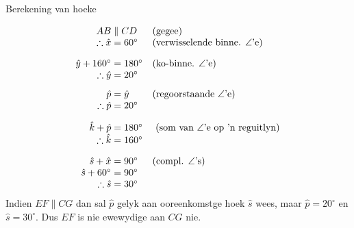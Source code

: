 \begin{wex}{Berekening van hoeke}
{\begin{center}
{}
 \end{center}
} 
{

\begin{equation*}
\begin{array}{r@{\;}l@{\quad}l}
AB &\parallel CD & \mbox{(gegee)} \\
\therefore \hat{x}&=60^{\circ} & \mbox{(verwisselende binne. $\angle$'e)}  \vspace{10pt} \\

\hat{y} + 160^\circ &= 180^{\circ}  & \mbox{(ko-binne. $\angle$'e)} \\
\therefore \hat{y} &= 20^{\circ} &   \vspace{8pt}\\


\hat{p} &= \hat{y} & \mbox{(regoorstaande $\angle$'e)} \\
\therefore \hat{p} &= 20^{\circ} &  \vspace{10pt}\\



 \hat{k} + \hat{p} &= 180^{\circ}  &\mbox{ (som van $\angle$'e op 'n reguitlyn)} \\
\therefore \hat{k} &= 160^{\circ} &  \vspace{10pt}\\


 \hat{s} + \hat{x} &= 90^{\circ}  & \mbox{(compl. $\angle$'s)} \\ 
 \hat{s} + 60^\circ &= 90^{\circ} & \\
\therefore \hat{s} &= 30^{\circ} &  
\end{array}
\end{equation*} 
Indien $EF \parallel CG$ dan sal $\hat{p}$ gelyk aan ooreenkomstge hoek $\hat{s}$ wees, maar $\hat{p} = 20^{\circ}$ en
$\hat{s}= 30^{\circ}$. Dus $EF$ is nie ewewydige aan $ CG$ nie.

}
\end{wex}


